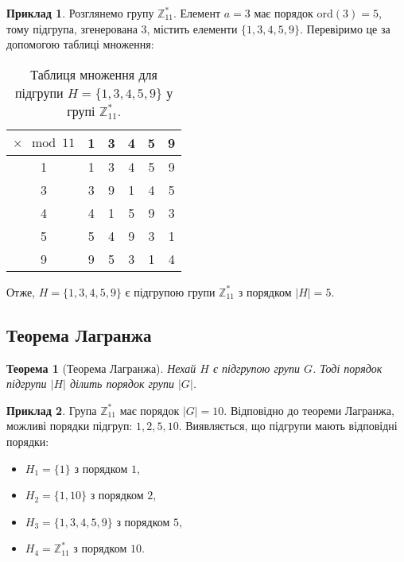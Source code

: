 \documentclass[12pt]{report}
\theoremstyle{definition}
\newtheorem{example}{Приклад}[chapter]
\theoremstyle{plain}
\newtheorem{theorem}{Теорема}[chapter]
\begin{document}
\begin{example}
Розглянемо групу \( \mathbb{Z}^*_{11} \). Елемент \( a = 3 \) має порядок \( \text{ord}(3) = 5 \), тому підгрупа, згенерована \( 3 \), містить елементи \( \{1, 3, 4, 5, 9\} \). Перевіримо це за допомогою таблиці множення:

\begin{table}[h!]
\centering
\begin{tabular}{c|ccccc}
$\times \mod 11$ & 1 & 3 & 4 & 5 & 9 \\
\hline
1 & 1 & 3 & 4 & 5 & 9 \\
3 & 3 & 9 & 1 & 4 & 5 \\
4 & 4 & 1 & 5 & 9 & 3 \\
5 & 5 & 4 & 9 & 3 & 1 \\
9 & 9 & 5 & 3 & 1 & 4 \\
\end{tabular}
\caption{Таблиця множення для підгрупи \( H = \{1, 3, 4, 5, 9\} \) у групі \( \mathbb{Z}^*_{11} \).}
\label{tab:multiplication_H}
\end{table}

Отже, \( H = \{1, 3, 4, 5, 9\} \) є підгрупою групи \( \mathbb{Z}^*_{11} \) з порядком \( |H| = 5 \).
\end{example}

\subsection{Теорема Лагранжа}

\begin{theorem}[Теорема Лагранжа]
Нехай \( H \) є підгрупою групи \( G \). Тоді порядок підгрупи \( |H| \) ділить порядок групи \( |G| \).
\end{theorem}

\begin{example}
Група \( \mathbb{Z}^*_{11} \) має порядок \( |G| = 10 \). Відповідно до теореми Лагранжа, можливі порядки підгруп: \( 1, 2, 5, 10 \). Виявляється, що підгрупи мають відповідні порядки:
\begin{itemize}
    \item \( H_1 = \{1\} \) з порядком \( 1 \),
    \item \( H_2 = \{1, 10\} \) з порядком \( 2 \),
    \item \( H_3 = \{1, 3, 4, 5, 9\} \) з порядком \( 5 \),
    \item \( H_4 = \mathbb{Z}^*_{11} \) з порядком \( 10 \).
\end{itemize}
\end{example}
\end{document}
